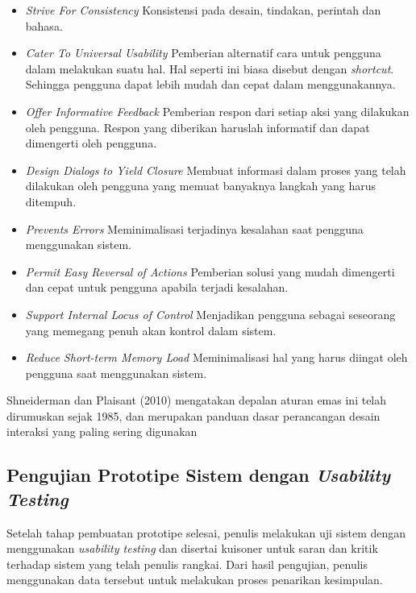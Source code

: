 	\begin{itemize}
		\item \textit{Strive For Consistency}
		\subitem Konsistensi pada desain, tindakan, perintah dan bahasa.
		\item \textit{Cater To Universal Usability}
		\subitem Pemberian alternatif cara untuk pengguna dalam melakukan suatu hal. Hal seperti ini biasa disebut dengan \textit{shortcut}. Sehingga pengguna dapat lebih mudah dan cepat dalam menggunakannya.
		\item \textit{Offer Informative Feedback}
		\subitem Pemberian respon dari setiap aksi yang dilakukan oleh pengguna. Respon yang diberikan haruslah informatif dan dapat dimengerti oleh pengguna.
		\item \textit{Design Dialogs to Yield Closure}
		\subitem Membuat informasi dalam proses yang telah dilakukan oleh pengguna yang memuat banyaknya langkah yang harus ditempuh.
		\item \textit{Prevents Errors}
		\subitem Meminimalisasi terjadinya kesalahan saat pengguna menggunakan sistem.
		\item \textit{Permit Easy Reversal of Actions}
		\subitem Pemberian solusi yang mudah dimengerti dan cepat untuk pengguna apabila terjadi kesalahan.
		\item \textit{Support Internal Locus of Control}
		\subitem Menjadikan pengguna sebagai seseorang yang memegang penuh akan kontrol dalam sistem.
		\item \textit{Reduce Short-term Memory Load}
		\subitem Meminimalisasi hal yang harus diingat oleh pengguna saat menggunakan sistem.
	\end{itemize}

	Shneiderman dan Plaisant (2010) mengatakan depalan aturan emas ini telah dirumuskan sejak 1985, dan merupakan panduan dasar perancangan desain interaksi yang paling sering digunakan
	
	\subsection{Pengujian Prototipe Sistem dengan \textit{Usability Testing}}
	
	Setelah tahap pembuatan prototipe selesai, penulis melakukan uji sistem dengan menggunakan \textit{usability testing} dan disertai kuisoner untuk saran dan kritik terhadap sistem yang telah penulis rangkai. Dari hasil pengujian, penulis menggunakan data tersebut untuk melakukan proses penarikan kesimpulan.
	
